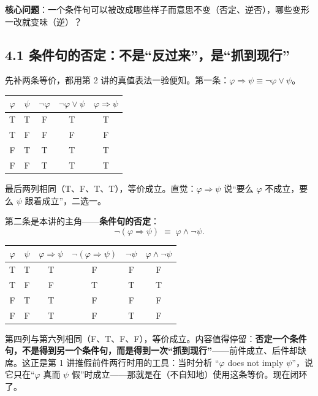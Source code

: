 \documentclass[UTF8,a4paper,11pt]{ctexart}
\begin{document}
\textbf{核心问题}：一个条件句可以被改成哪些样子而意思不变（否定、逆否），哪些变形一改就变味（逆）？

\subsection*{4.1 条件句的否定：不是“反过来”，是“抓到现行”}

先补两条等价，都用第 2 讲的真值表法一验便知。第一条：$\varphi \Rightarrow \psi \equiv \neg \varphi \lor \psi$。

\begin{center}
\begin{tabular}{cc|c|c|c}
\toprule
$\varphi$ & $\psi$ & $\neg \varphi$ & $\neg \varphi \lor \psi$ & $\varphi \Rightarrow \psi$ \\
\midrule
T & T & F & T & T \\
T & F & F & F & F \\
F & T & T & T & T \\
F & F & T & T & T \\
\bottomrule
\end{tabular}
\end{center}

最后两列相同（T、F、T、T），等价成立。直觉：$\varphi \Rightarrow \psi$ 说“要么 $\varphi$ 不成立，要么 $\psi$ 跟着成立”，二选一。

第二条是本讲的主角——\textbf{条件句的否定}：
\[
\neg (\varphi \Rightarrow \psi) \;\equiv\; \varphi \land \neg \psi .
\]

\begin{center}
\begin{tabular}{cc|c|c|c|c}
\toprule
$\varphi$ & $\psi$ & $\varphi \Rightarrow \psi$ & $\neg (\varphi \Rightarrow \psi)$ & $\neg \psi$ & $\varphi \land \neg \psi$ \\
\midrule
T & T & T & F & F & F \\
T & F & F & T & T & T \\
F & T & T & F & F & F \\
F & F & T & F & T & F \\
\bottomrule
\end{tabular}
\end{center}

第四列与第六列相同（F、T、F、F），等价成立。内容值得停留：\textbf{否定一个条件句，不是得到另一个条件句，而是得到一次“抓到现行”}——前件成立、后件却缺席。这正是第 1 讲推假前件两行时用的工具：当时分析 “$\varphi$ does not imply $\psi$”，说它只在“$\varphi$ 真而 $\psi$ 假”时成立——那就是在（不自知地）使用这条等价。现在闭环了。
\end{document}
